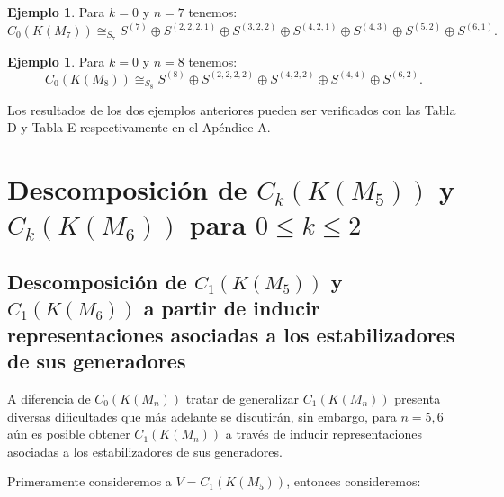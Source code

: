 \documentclass[12pt]{book}
\theoremstyle{definition}
\newtheorem{example}[theorem]{Ejemplo}
\newcounter{in}
\begin{document}
\begin{example}
Para $k =0$ y $n = 7$ tenemos:
\begin{equation}
C_{0}(K(M_{7})) \cong_{S_{7}}  S^{(7)} \oplus S^{(2,2,2,1)} \oplus S^{(3,2,2)} \oplus S^{(4,2,1)} \oplus S^{(4,3)} \oplus S^{(5,2)} \oplus S^{(6,1)}.
\end{equation}
\end{example}
\begin{example}
Para $k =0$ y $n = 8$ tenemos:
\begin{equation}
C_{0}(K(M_{8})) \cong_{S_{8}}  S^{(8)} \oplus S^{(2,2,2,2)} \oplus S^{(4,2,2)} \oplus S^{(4,4)} \oplus S^{(6,2)}.
\end{equation}
\end{example}
Los resultados de los dos ejemplos anteriores pueden ser verificados con las Tabla D y Tabla E respectivamente en el Apéndice A.

\section{Descomposición de $C_{k}(K(M_5))$ y $C_{k}(K(M_6))$ para $0 \leq k \leq 2$}
\subsection{Descomposición de $C_{1}(K(M_5))$ y $C_{1}(K(M_6))$ a partir de inducir representaciones asociadas a los estabilizadores de sus generadores}
\label{Ind_est_o_1}

A diferencia de $C_{0}(K(M_n))$ tratar de generalizar $C_{1}(K(M_n))$ presenta diversas dificultades que más adelante se discutirán, sin embargo, para $n = 5, 6$ aún es posible obtener $C_{1}(K(M_n))$ a través de inducir representaciones asociadas a los estabilizadores de sus generadores.

Primeramente consideremos a $V = C_{1}(K(M_5))$, entonces consideremos:
\end{document}
